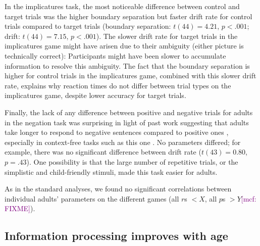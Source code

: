 \documentclass[10pt,letterpaper]{article}
\newcommand{\mcf}[1]{\textcolor{Purple}{[mcf: #1]}}
\begin{document}
In the implicatures task, the most noticeable difference between control and target trials was the higher boundary separation but faster drift rate for control trials compared to target trials (boundary separation: $t(44) = 4.21$, $p< .001$; drift: $t(44) = 7.15$, $p< .001$). The slower drift rate for target trials in the implicatures game might have arisen due to their ambiguity (either picture is technically correct): Participants might have been slower to accumulate information to resolve this ambiguity. The fact that the boundary separation is higher for control trials in the implicatures game, combined with this slower drift rate, explains why reaction times do not differ between trial types on the implicatures game, despite lower accuracy for target trials.

Finally, the lack of any difference between positive and negative trials for adults in the negation task was surprising in light of past work suggesting that adults take longer to respond to negative sentences compared to positive ones \cite{hclark1972}, especially in context-free tasks such as this one \cite{nordmeyer2014a}. No parameters differed; for example, there was no significant difference between drift rate ($t(43) = 0.80$, $p = .43$). One possibility is that the large number of repetitive trials, or the simplistic and child-friendly stimuli, made this task easier for adults.

As in the standard analyses, we found no significant correlations between individual adults' parameters on the different games (all $r$s $< X$, all $p$s $> Y$\mcf{FIXME}).




\subsection{Information processing improves with age}

\end{document}
